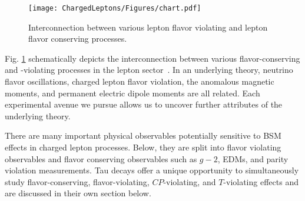 \begin{figure}[t!]
\begin{center}
\texttt{[image: ChargedLeptons/Figures/chart.pdf]}
\caption{\label{CL:chart}Interconnection between various lepton flavor violating and  lepton flavor conserving processes.}
\end{center}
\end{figure}

Fig. \ref{CL:chart} schematically depicts the interconnection between
various flavor-conserving and -violating processes in the lepton
sector~\cite{IF_review}.  In an underlying theory, neutrino flavor oscillations,
charged lepton flavor violation,  the anomalous magnetic moments, and permanent electric
dipole moments are all related.  Each experimental avenue we pursue allows us to uncover further attributes of the underlying theory. 

There are many important physical observables potentially sensitive to
BSM effects in charged lepton processes. Below, they are  split into  flavor violating observables and flavor conserving observables  such as $g-2$, EDMs, and parity violation measurements. Tau decays offer a unique opportunity to simultaneously study flavor-conserving, flavor-violating, $C\!P$-violating,  and $T$-violating effects and are discussed in
 their own section below.
